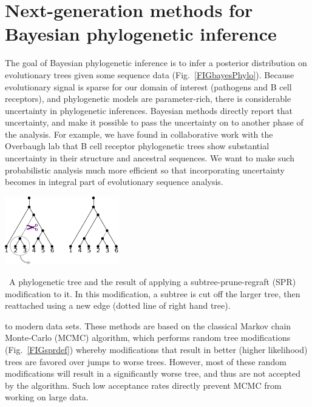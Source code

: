 \documentclass[nobib]{tufte-handout}
\begin{document}
\section{Next-generation methods for Bayesian phylogenetic inference}
\vspace{-0.3cm}
The goal of Bayesian phylogenetic inference is to infer a posterior distribution on evolutionary trees given some sequence data (Fig.~\ref{FIGbayesPhylo}).
Because evolutionary signal is sparse for our domain of interest (pathogens and B cell receptors), and phylogenetic models are parameter-rich, there is considerable uncertainty in phylogenetic inferences.
Bayesian methods directly report that uncertainty, and make it possible to pass the uncertainty on to another phase of the analysis.
For example, we have found in collaborative work with the Overbaugh lab \cite{Simonich2019-nn} that B cell receptor phylogenetic trees show substantial uncertainty in their structure and ancestral sequences.
We want to make such probabilistic analysis much more efficient so that incorporating uncertainty becomes in integral part of evolutionary sequence analysis.

\begin{marginfigure}[-0.in]%
  \includegraphics[width=1.95in]{spr-definition}
  \caption{\
    A phylogenetic tree and the result of applying a subtree-prune-regraft (SPR) modification to it.
    In this modification, a subtree is cut off the larger tree, then reattached using a new edge (dotted line of right hand tree).
    }
  \label{FIGsprdef}
\end{marginfigure}%

 to modern data sets.
These methods are based on the classical Markov chain Monte-Carlo (MCMC) algorithm, which performs random tree modifications (Fig.~\ref{FIGsprdef}) whereby modifications that result in better (higher likelihood) trees are favored over jumps to worse trees.
However, most of these random modifications will result in a significantly worse tree, and thus are not accepted by the algorithm.
Such low acceptance rates directly prevent MCMC from working on large data.
\end{document}
